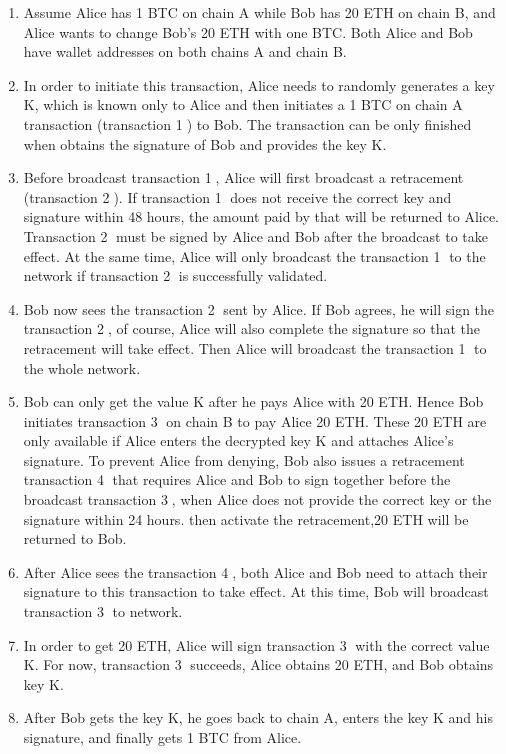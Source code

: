 \begin{enumerate}
  \item Assume Alice has 1 BTC on chain A while Bob has 20 ETH on chain B, and Alice wants to change Bob's 20 ETH with one BTC. Both Alice and Bob have wallet addresses on both chains A and chain B.
    \item In order to initiate this transaction, Alice needs to randomly generates a key K, which is known only to Alice and then initiates a 1 BTC on chain A transaction (transaction \textcircled{1}) to Bob. The transaction can be only finished when obtains the signature of Bob and provides the key K.
    \item Before broadcast transaction \textcircled{1}, Alice will first broadcast a retracement (transaction \textcircled{2}). If transaction \textcircled{1} does not receive the correct key and signature within 48 hours, the amount paid by that will be returned to Alice. Transaction \textcircled{2} must be signed by Alice and Bob after the broadcast to take effect. At the same time, Alice will only broadcast the transaction \textcircled{1} to the network if transaction \textcircled{2} is successfully validated.
    \item Bob now sees the transaction \textcircled{2} sent by Alice. If Bob agrees, he will sign the transaction \textcircled{2}, of course, Alice will also complete the signature so that the retracement will take effect. Then Alice will broadcast the transaction \textcircled{1} to the whole network.
    \item Bob can only get the value K after he pays Alice with 20 ETH. Hence Bob initiates transaction \textcircled{3} on chain B to pay Alice 20 ETH. These 20 ETH are only available if Alice enters the decrypted key K and attaches Alice's signature. To prevent Alice from denying, Bob also issues a retracement transaction \textcircled{4} that requires Alice and Bob to sign together before the broadcast transaction \textcircled{3}, when Alice does not provide the correct key or the signature within 24 hours. then activate the retracement,20 ETH will be returned to Bob.
    \item After Alice sees the transaction \textcircled{4}, both Alice and Bob need to attach their signature to this transaction to take effect. At this time, Bob will broadcast transaction \textcircled{3} to network.
    \item In order to get 20 ETH, Alice will sign transaction \textcircled{3} with the correct value K. For now, transaction \textcircled{3} succeeds, Alice obtains 20 ETH, and Bob obtains key K.
    \item After Bob gets the key K, he goes back to chain A, enters the key K and his signature, and finally gets 1 BTC from Alice.
\end{enumerate}
